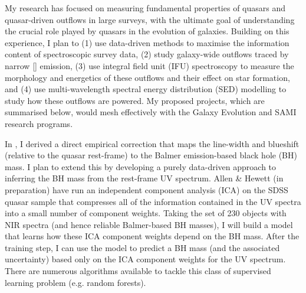 


\noindent My research has focused on measuring fundamental properties of quasars and quasar-driven outflows in large surveys, with the ultimate goal of understanding the crucial role played by quasars in the evolution of galaxies.
Building on this experience, I plan to (1) use data-driven methods to maximise the information content of spectroscopic survey data, (2) study galaxy-wide outflows traced by narrow [] emission, (3) use integral field unit (IFU) spectroscopy to measure the morphology and energetics of these outflows and their effect on star formation, and (4) use multi-wavelength spectral energy distribution (SED) modelling to study how these outflows are powered.  
My proposed projects, which are summarised below, would mesh effectively with the Galaxy Evolution and SAMI research programs. 

In \citet{coatman17}, I derived a direct empirical correction that maps the  line-width and blueshift (relative to the quasar rest-frame) to the Balmer emission-based black hole (BH) mass. 
I plan to extend this by developing a purely data-driven approach to inferring the BH mass from the rest-frame UV spectrum. 
Allen \& Hewett (in preparation) have run an independent component analysis (ICA) on the SDSS quasar sample that compresses all of the information contained in the UV spectra into a small number of component weights.
Taking the set of 230 objects with NIR spectra (and hence reliable Balmer-based BH masses), I will build a model that learns how these ICA component weights depend on the BH mass. 
After the training step, I can use the model to predict a BH mass (and the associated uncertainty) based only on the ICA component weights for the UV spectrum.
There are numerous algorithms available to tackle this class of supervised learning problem (e.g. random forests). 

